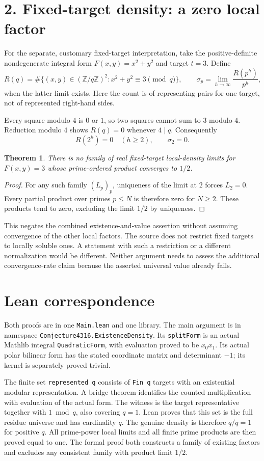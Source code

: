 \documentclass[11pt]{article}
\newtheorem{theorem}{Theorem}
\begin{document}
\section*{2. Fixed-target density: a zero local factor}
For the separate, customary fixed-target interpretation, take the positive-definite nondegenerate integral form $F(x,y)=x^2+y^2$ and target $t=3$. Define
\[
 R(q)=\#\{(x,y)\in(\mathbb Z/q\mathbb Z)^2:x^2+y^2\equiv3\pmod q\},
 \qquad
 \sigma_p=\lim_{h\to\infty}\frac{R(p^h)}{p^h},
\]
when the latter limit exists. Here the count is of representing pairs for one target, not of represented right-hand sides.

Every square modulo $4$ is $0$ or $1$, so two squares cannot sum to $3$ modulo $4$. Reduction modulo $4$ shows $R(q)=0$ whenever $4\mid q$. Consequently
\[
 R(2^h)=0\quad(h\geq2),\qquad \sigma_2=0.
\]
\begin{theorem}
There is no family of real fixed-target local-density limits for $F(x,y)=3$ whose prime-ordered product converges to $1/2$.
\end{theorem}
\begin{proof}
For any such family $(L_p)_p$, uniqueness of the limit at $2$ forces $L_2=0$. Every partial product over primes $p\leq N$ is therefore zero for $N\geq2$. These products tend to zero, excluding the limit $1/2$ by uniqueness.
\end{proof}
This negates the combined existence-and-value assertion without assuming convergence of the other local factors. The source does not restrict fixed targets to locally soluble ones. A statement with such a restriction or a different normalization would be different. Neither argument needs to assess the additional convergence-rate claim because the asserted universal value already fails.

\section*{Lean correspondence}
Both proofs are in one \texttt{Main.lean} and one library. The main argument is in namespace \texttt{Conjecture4316.ExistenceDensity}. Its \texttt{splitForm} is an actual Mathlib integral \texttt{QuadraticForm}, with evaluation proved to be $x_0x_1$. Its actual polar bilinear form has the stated coordinate matrix and determinant $-1$; its kernel is separately proved trivial.

The finite set \texttt{represented q} consists of \texttt{Fin q} targets with an existential modular representation. A bridge theorem identifies the counted multiplication with evaluation of the actual form. The witness is the target representative together with $1\bmod q$, also covering $q=1$. Lean proves that this set is the full residue universe and has cardinality $q$. The genuine density is therefore $q/q=1$ for positive $q$. All prime-power local limits and all finite prime products are then proved equal to one. The formal proof both constructs a family of existing factors and excludes any consistent family with product limit $1/2$.
\end{document}
